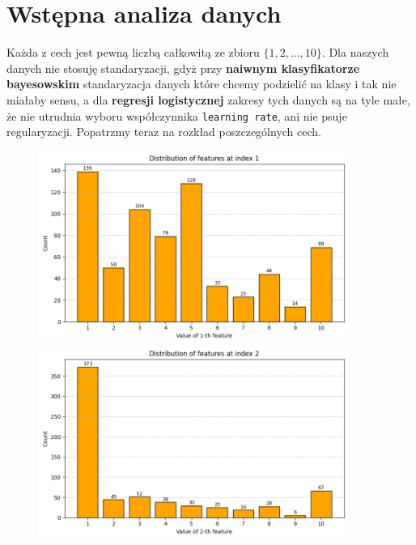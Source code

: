 \documentclass[polish,12pt,a4paper]{extarticle}
\begin{document}
\section*{Wstępna analiza danych}
Każda z cech jest pewną liczbą całkowitą ze zbioru $\{1, 2, \dots, 10\}$. Dla naszych danych nie stosuję standaryzacji, gdyż przy \textbf{naiwnym klasyfikatorze bayesowskim} standaryzacja danych które chcemy podzielić na klasy i tak nie miałaby sensu, a dla \textbf{regresji logistycznej} zakresy tych danych są na tyle małe, że nie utrudnia wyboru współczynnika \texttt{learning rate}, ani nie psuje regularyzacji. Popatrzmy teraz na rozkład poszczególnych cech.
\begin{figure}[h!]
    \centering
    \begin{minipage}[b]{0.3\textwidth}
    \includegraphics[width=0.9\textwidth]{img/feature_1.png}
    \end{minipage} \hspace{}
    \begin{minipage}[b]{0.3\textwidth}
    \includegraphics[width=0.9\textwidth]{img/feature_2.png}
    \end{minipage} \hspace{}

\end{figure}
\end{document}
